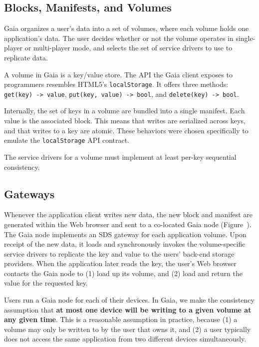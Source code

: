 \subsection{Blocks, Manifests, and Volumes}

Gaia organizes a user's data into a set of volumes, where each volume
holds one application's data.  The user decides whether or not the volume
operates in single-player or multi-player mode, and selects the set of
service drivers to use to replicate data.

A volume in Gaia is a key/value store.  The API the Gaia client exposes to
programmers resembles HTML5's \texttt{localStorage}.  It offers three methods:
\texttt{get(key) -> value}, \texttt{put(key, value) -> bool}, and
\texttt{delete(key) -> bool}.

Internally, the set of keys in a volume are bundled into a single manifest.
Each value is the associated block.  This means that writes are serialized
across keys, and that writes to a key are atomic.  These behaviors were chosen
specifically to emulate the \texttt{localStorage} API contract.

The service drivers for a volume must implement at least per-key sequential
consistency.

\subsection{Gateways}


Whenever the application client writes new data, the new block and manifest are
generated within the Web browser and sent to a co-located Gaia node
(Figure~).  The Gaia node implements an SDS gateway for
each application volume.  Upon receipt of the new data, it loads and
synchronously invokes the volume-specific service drivers to replicate the key
and value to the users' back-end storage providers.  When the application later
reads the key, the user's Web browser contacts the Gaia node to (1) load up its
volume, and (2) load and return the value for the requested key.

Users run a Gaia node for each of their devices.
In Gaia, we make the consistency assumption that \textbf{at most one device will
be writing to a given volume at any given time}.  This is a reasonable
assumption in practice, because (1) a volume may only be written to by the user
that owns it, and (2) a user typically does not access the same application from
two different devices simultaneously.


